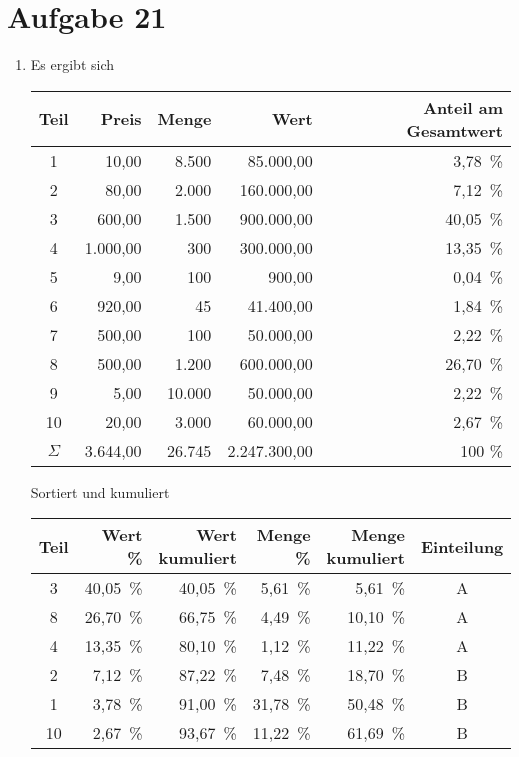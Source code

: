 \documentclass{article}
\begin{document}
	\section*{Aufgabe 21}
	\begin{enumerate}[label=(\alph*)]
		\item Es ergibt sich
		\begin{center}
			\begin{tabular}{c|rr|rr}
				\textbf{Teil} & \textbf{Preis} & \textbf{Menge} & \textbf{Wert} & \textbf{Anteil am Gesamtwert} \\
				\hline
				1 & 10,00 \EUR & 8.500 & 85.000,00 \EUR & 3,78 \% \\
 				2 & 80,00 \EUR & 2.000 & 160.000,00 \EUR & 7,12 \% \\
				3 & 600,00 \EUR & 1.500 & 900.000,00 \EUR & 40,05 \% \\
				4 & 1.000,00 \EUR & 300 & 300.000,00 \EUR & 13,35 \% \\
				5 & 9,00 \EUR & 100 & 900,00 \EUR & 0,04 \% \\
				6 & 920,00 \EUR & 45 & 41.400,00 \EUR & 1,84 \% \\
				7 & 500,00 \EUR & 100 & 50.000,00 \EUR & 2,22 \% \\
				8 & 500,00 \EUR & 1.200 & 600.000,00 \EUR & 26,70 \% \\
				9 & 5,00 \EUR & 10.000 & 50.000,00 \EUR & 2,22 \% \\
				10 & 20,00 \EUR & 3.000 & 60.000,00 \EUR & 2,67 \% \\
				\hline
				$\Sigma$ & 3.644,00 \EUR & 26.745 & 2.247.300,00 \EUR & 100 \%
			\end{tabular}
		\end{center}
		Sortiert und kumuliert
		\begin{center}
			\begin{tabular}{c|rr|rr|c}
				\textbf{Teil} & \textbf{Wert \%} & \textbf{Wert kumuliert} & \textbf{Menge \%} & \textbf{Menge kumuliert} & \textbf{Einteilung} \\
				\hline
				3 & 40,05 \% & 40,05 \% & 5,61 \% & 5,61 \% & A \\
				8 & 26,70 \% & 66,75 \% & 4,49 \% & 10,10 \% & A \\
				4 & 13,35 \% & 80,10 \% & 1,12 \% & 11,22 \% & A \\
				2 & 7,12 \% & 87,22 \% & 7,48 \% & 18,70 \% & B \\
				1 & 3,78 \% & 91,00 \% & 31,78 \% & 50,48 \% & B \\
				10 & 2,67 \% & 93,67 \% & 11,22 \% & 61,69 \% & B \\

\end{tabular}
\end{center}
\end{enumerate}
\end{document}
